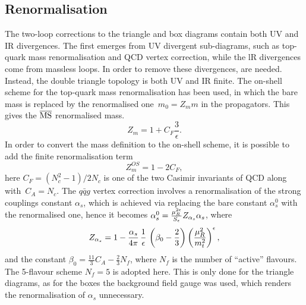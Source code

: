 \subsection{Renormalisation}
\label{subsec:ren}
The two-loop corrections to the triangle and box diagrams contain both UV and IR divergences. The first emerges from UV divergent sub-diagrams, such as top-quark mass renormalisation and QCD vertex correction, while the lR divergences come from massless loops. In order to remove these divergences, are needed. Instead, the double triangle topology is both UV and IR finite.
The on-shell scheme for the top-quark mass renormalisation has been used, in which the bare mass is replaced by the renormalised one~$ m_0 = Z_m m$  in the propagators. This gives the $\overline{\mathrm{MS}}$ renormalised mass. 
\begin{equation}
	Z_m = 1+ C_F \frac{3}{\epsilon}.
\end{equation}
In order to convert the mass definition to the on-shell scheme, it is possible to add the finite renormalisation term
\begin{equation}
	Z^{OS}_m = 1- 2 C_F,
\end{equation}
here $C_F=(N_c^2-1)/2N_c$ is one of the two Casimir invariants of QCD along with~$ C_A=N_c$. 
The $q \bar q g$ vertex correction involves a renormalisation of the strong couplings constant $ \alpha_s$, which is achieved via replacing the bare constant $\alpha_s^0$ with the renormalised one, hence it becomes  $ \alpha^0_s = \frac{\mu_R^{2\epsilon}}{S_\epsilon}  Z_{\alpha_s} \alpha_s$, where
\begin{equation}
	Z_{\alpha_s} = 1- \frac{\alpha_s}{4 \pi} \, \frac{1}{ \epsilon}\,  \left( \beta_0-\frac{2}{3} \right) \left(\frac{\mu_R^2}{m_t^2} \right) ^\epsilon,
\end{equation}
and the constant $ \beta_0 = \frac{11}{3} C_A -\frac{2}{3}N_f$, where $N_f$ is the number of ``active'' flavours. The 5-flavour scheme $N_f=5$ is adopted here.  This is only done for the triangle diagrams, as for the boxes the background field gauge was used, which renders the renormalisation of $\alpha_s$ unnecessary. 
